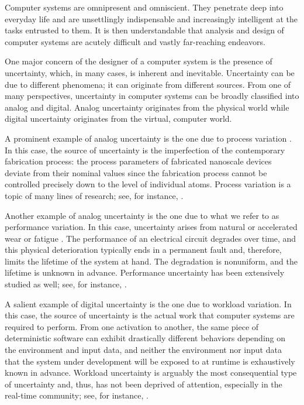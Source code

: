Computer systems are omnipresent and omniscient. They penetrate deep into
everyday life and are unsettlingly indispensable and increasingly intelligent at
the tasks entrusted to them. It is then understandable that analysis and design
of computer systems are acutely difficult and vastly far-reaching endeavors.

One major concern of the designer of a computer system is the presence of
uncertainty, which, in many cases, is inherent and inevitable. Uncertainty can
be due to different phenomena; it can originate from different sources. From one
of many perspectives, uncertainty in computer systems can be broadly classified
into analog and digital. Analog uncertainty originates from the physical world
while digital uncertainty originates from the virtual, computer world.

A prominent example of analog uncertainty is the one due to process variation
\cite{srivastava2010}. In this case, the source of uncertainty is the
imperfection of the contemporary fabrication process: the process parameters of
fabricated nanoscale devices deviate from their nominal values since the
fabrication process cannot be controlled precisely down to the level of
individual atoms. Process variation is a topic of many lines of research; see,
for instance, \cite{bhardwaj2006, bhardwaj2008, chandra2010, juan2012, lee2013}.

Another example of analog uncertainty is the one due to what we refer to as
performance variation. In this case, uncertainty arises from natural or
accelerated wear or fatigue \cite{jedec2016}. The performance of an electrical
circuit degrades over time, and this physical deterioration typically ends in a
permanent fault and, therefore, limits the lifetime of the system at hand. The
degradation is nonuniform, and the lifetime is unknown in advance. Performance
uncertainty has been extensively studied as well; see, for instance,
\cite{coskun2006, huang2009b, das2014c}.

A salient example of digital uncertainty is the one due to workload variation.
In this case, the source of uncertainty is the actual work that computer systems
are required to perform. From one activation to another, the same piece of
deterministic software can exhibit drastically different behaviors depending on
the environment and input data, and neither the environment nor input data that
the system under development will be exposed to at runtime is exhaustively known
in advance. Workload uncertainty is arguably the most consequential type of
uncertainty and, thus, has not been deprived of attention, especially in the
real-time community; see, for instance, \cite{diaz2002, santinelli2011,
quinton2012, tanasa2015}.

